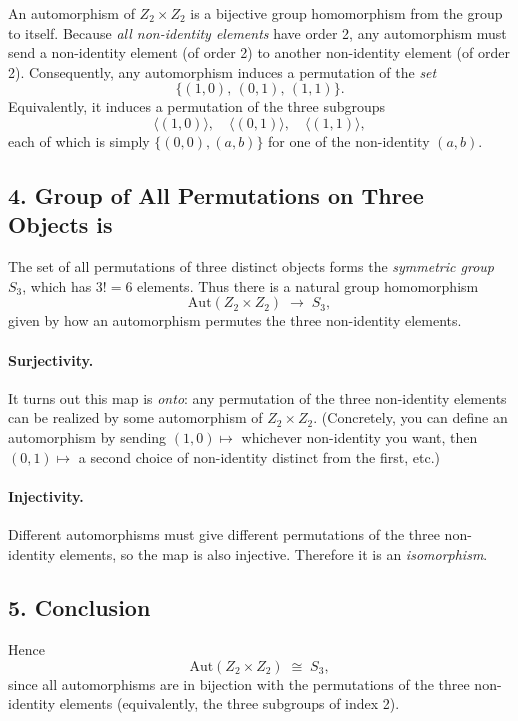 \documentclass[12pt]{article}
\theoremstyle{definition} %
\theoremstyle{plain} %
\begin{document}
An automorphism of $Z_2 \times Z_2$ is a bijective group homomorphism from the group to itself.  
Because \emph{all non-identity elements} have order 2, any automorphism must send a non-identity element (of order 2) to another non-identity element (of order 2).  Consequently, any automorphism induces a permutation of the \emph{set} 
\[
  \{ (1,0),\, (0,1),\, (1,1) \}.
\]
Equivalently, it induces a permutation of the three subgroups
\[
  \langle (1,0)\rangle, \quad \langle (0,1)\rangle, \quad \langle (1,1)\rangle,
\]
each of which is simply $\{ (0,0), (a,b)\}$ for one of the non-identity $(a,b)$.

\subsection*{4. Group of All Permutations on Three Objects is }

The set of all permutations of three distinct objects forms the \emph{symmetric group} $S_3$, which has $3!=6$ elements.  Thus there is a natural group homomorphism
\[
   \mathrm{Aut}(Z_2 \times Z_2)
   \;\longrightarrow\; S_3,
\]
given by how an automorphism permutes the three non-identity elements.  

\paragraph{Surjectivity.}
It turns out this map is \emph{onto}: any permutation of the three non-identity elements can be realized by some automorphism of $Z_2 \times Z_2$.  (Concretely, you can define an automorphism by sending $(1,0)\mapsto$ whichever non-identity you want, then $(0,1)\mapsto$ a second choice of non-identity distinct from the first, etc.)

\paragraph{Injectivity.}
Different automorphisms must give different permutations of the three non-identity elements, so the map is also injective.  Therefore it is an \emph{isomorphism}.

\subsection*{5. Conclusion}

Hence 
\[
  \mathrm{Aut}(Z_2 \times Z_2)
  \;\cong\;
  S_3,
\]
since all automorphisms are in bijection with the permutations of the three non-identity elements (equivalently, the three subgroups of index 2).
\end{document}
